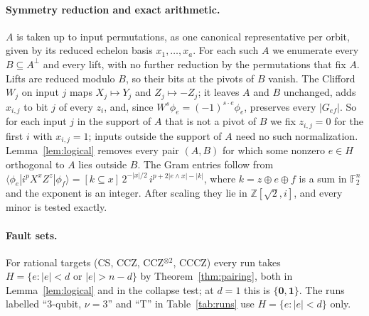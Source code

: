 \documentclass[aps,prl,reprint,twocolumn,amsmath,amssymb,floatfix,nofootinbib,superscriptaddress]{revtex4-2}
\newcommand{\F}{\mathbb F_2}
\begin{document}
\paragraph*{Symmetry reduction and exact arithmetic.}
$A$ is taken up to input permutations, as one canonical representative per orbit, given by its reduced echelon basis $x_1,\dots,x_a$. For each such $A$ we enumerate every $B\subseteq A^\perp$ and every lift, with no further reduction by the permutations that fix $A$. Lifts are reduced modulo $B$, so their bits at the pivots of $B$ vanish. The Clifford $W_j$ on input $j$ maps $X_j\mapsto Y_j$ and $Z_j\mapsto-Z_j$; it leaves $A$ and $B$ unchanged, adds $x_{i,j}$ to bit $j$ of every $z_i$, and, since $W^s\phi_e=(-1)^{s\cdot e}\phi_e$, preserves every $|G_{ef}|$. So for each input $j$ in the support of $A$ that is not a pivot of $B$ we fix $z_{i,j}=0$ for the first $i$ with $x_{i,j}=1$; inputs outside the support of $A$ need no such normalization. Lemma~\ref{lem:logical} removes every pair $(A,B)$ for which some nonzero $e\in H$ orthogonal to $A$ lies outside $B$. The Gram entries follow from $\langle\phi_e|i^pX^xZ^z|\phi_f\rangle=[k\subseteq x]\,2^{-|x|/2}\,i^{p+2|e\wedge x|-|k|}$, where $k=z\oplus e\oplus f$ is a sum in $\F^n$ and the exponent is an integer. After scaling they lie in $\mathbb Z[\sqrt2,i]$, and every minor is tested exactly.

\paragraph*{Fault sets.}
For rational targets (CS, CCZ, CCZ$^{\otimes2}$, CCCZ) every run takes $H=\{e:|e|<d\text{ or }|e|>n-d\}$ by Theorem~\ref{thm:pairing}, both in Lemma~\ref{lem:logical} and in the collapse test; at $d=1$ this is $\{\mathbf0,\mathbf1\}$. The runs labelled ``3-qubit, $\nu=3$'' and ``T'' in Table~\ref{tab:runs} use $H=\{e:|e|<d\}$ only.
\end{document}
